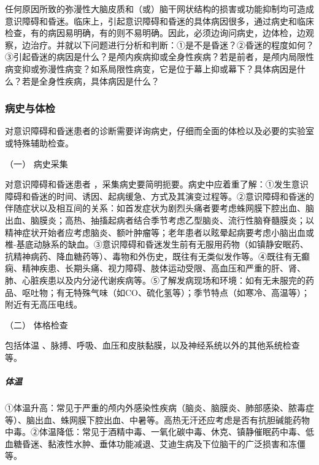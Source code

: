 任何原因所致的弥漫性大脑皮质和（或）脑干网状结构的损害或功能抑制均可造成意识障碍和昏迷。临床上，引起意识障碍和昏迷的具体病因很多，通过病史和临床检查，有的病因易明确，有的则不易明确。因此，必须边询问病史，边体检，边观察，边治疗。并就以下问题进行分析和判断：①是不是昏迷？②昏迷的程度如何？③引起昏迷的病因是什么？是颅内疾病抑或全身性疾病？若是前者，是颅内局限性病变抑或弥漫性病变？如系局限性病变，它是位于幕上抑或幕下？具体病因是什么？若是全身性疾病，具体病因是什么？

\subsubsection{病史与体检}

对意识障碍和昏迷患者的诊断需要详询病史，仔细而全面的体检以及必要的实验室或特殊辅助检查。

\hypertarget{text00010.htmlux5cux23CHP1-2-2-1-1}{}
（一） 病史采集

对意识障碍和昏迷患者
，采集病史要简明扼要。病史中应着重了解：①发生意识障碍和昏迷的时间、诱因、起病缓急、方式及其演变过程等。②意识障碍和昏迷的伴随症状以及相互间的关系：如首发症状为剧烈头痛者要考虑蛛网膜下腔出血、脑出血、脑膜炎；高热、抽搐起病者结合季节考虑乙型脑炎、流行性脑脊髓膜炎；以精神症状开始者应考虑脑炎、额叶肿瘤等；老年患者以眩晕起病要考虑小脑出血或椎-基底动脉系的缺血。③意识障碍和昏迷发生前有无服用药物（如镇静安眠药、抗精神病药、降血糖药等）、毒物和外伤史，既往有无类似发作等。④既往有无癫痫、精神疾患、长期头痛、视力障碍、肢体运动受限、高血压和严重的肝、肾、肺、心脏疾患以及内分泌代谢疾病等。⑤了解发病现场和环境：如有无未服完的药品、呕吐物；有无特殊气味（如CO、硫化氢等）；季节特点（如寒冷、高温等）；附近有无高压电线。

\hypertarget{text00010.htmlux5cux23CHP1-2-2-1-2}{}
（二） 体格检查

包括体温
、脉搏、呼吸、血压和皮肤黏膜，以及神经系统以外的其他系统检查等。

\subparagraph{体温}

①体温升高：常见于严重的颅内外感染性疾病（脑炎、脑膜炎、肺部感染、脓毒症等）、脑出血、蛛网膜下腔出血、中暑等。高热无汗还应考虑是否有抗胆碱能药物中毒。②体温降低：常见于酒精中毒、一氧化碳中毒、休克、镇静催眠药中毒、低血糖昏迷、黏液性水肿、垂体功能减退、艾迪生病及下位脑干的广泛损害和冻僵等。

